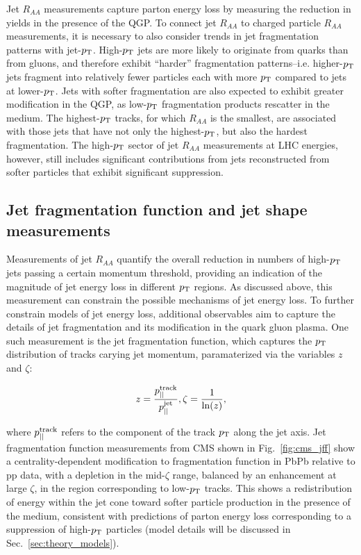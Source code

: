 Jet $R_{AA}$ measurements capture parton energy loss by measuring the reduction in yields in the presence of the QGP.  To connect jet $R_{AA}$ to charged particle $R_{AA}$ measurements, it is necessary to also consider trends in jet fragmentation patterns with jet-$p_{\rm T}$.  High-$p_{\rm T}$ jets are more likely to originate from quarks than from gluons, and therefore exhibit ``harder'' fragmentation patterns--i.e. higher-$p_{\rm T}$ jets fragment into relatively fewer particles each with more $p_{\rm T}$ compared to jets at lower-$p_{\rm T}$.  Jets with softer fragmentation are also expected to exhibit greater modification in the QGP, as low-$p_{\rm T}$ fragmentation products rescatter in the medium.  The highest-$p_{\rm T}$ tracks, for which $R_{AA}$ is the smallest, are associated with those jets that have not only the highest-$p_{\rm T}$, but also the hardest fragmentation.  The high-$p_{\rm T}$ sector of jet $R_{AA}$ measurements at LHC energies, however, still includes significant contributions from jets reconstructed from softer particles that exhibit significant suppression.

\clearpage

\subsection{Jet fragmentation function and jet shape measurements}
\label{sec:jff_jetshapes}

Measurements of jet $R_{AA}$ quantify the overall reduction in numbers of high-$p_{\rm T}$ jets passing a certain momentum threshold, providing an indication of the magnitude of jet energy loss in different $p_{\rm T}$ regions.  As discussed above, this measurement can constrain the possible mechanisms of jet energy loss.  To further constrain models of jet energy loss, additional observables aim to capture the details of jet fragmentation and its modification in the quark gluon plasma.  One such measurement is the jet fragmentation function, which captures the $p_{\rm T}$ distribution of tracks carying jet momentum, paramaterized via the variables $z$ and $\zeta$: 

\begin{equation}
\label{eq:jff_cms}
z = \frac{p^{\rm track}_{\rm ||}}{p^{\rm jet}_{\rm ||}}, \zeta = \frac{1}{{\rm ln} (z)},
\end{equation}

\noindent where $p^{\rm track}_{\rm ||}$ refers to the component of the track $p_{\rm T}$ along the jet axis.  Jet fragmentation function measurements from CMS shown in Fig.~\ref{fig:cms_jff} show a centrality-dependent modification to fragmentation function in PbPb relative to pp data, with a depletion in the mid-$\zeta$ range, balanced by an enhancement at large $\zeta$, in the region corresponding to low-$p_{\rm T}$ tracks.  This shows a redistribution of energy within the jet cone toward softer particle production in the presence of the medium, consistent with predictions of parton energy loss corresponding to a suppression of high-$p_{\rm T}$ particles (model details will be discussed in Sec.~\ref{sec:theory_models}).

